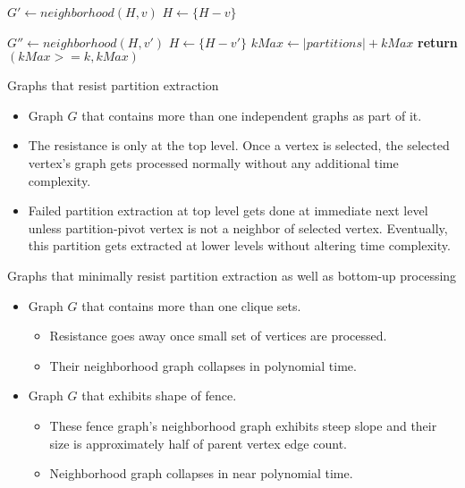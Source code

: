 \documentclass[landscape]{slides}
\begin{document}
\begin{algorithm}
	\begin{algorithmic}[1]
		\State $G' \gets neighborhood(H, v)$
		\State $H \gets \{H - v\}$
		
		\State $G'' \gets neighborhood(H, v')$
		\State $H \gets \{H - v'\}$
		\EndIf
		\EndFor
		\EndWhile
		\State $kMax \gets |partitions| + kMax$
		\State \textbf{return} $(kMax >= k, kMax)$
		\EndFunction
	\end{algorithmic}
\end{algorithm}

\clearpage


\begin{slide}
	\begin{center}{\large Graphs that resist partition extraction}\end{center}
	\begin{itemize}
		\setlength{\itemsep}{0pt}
		\setlength{\parskip}{20pt}
		\setlength{\parsep}{0pt}
		\item Graph $G$ that contains more than one independent graphs as part of it.
		\item The resistance is only at the top level. Once a vertex is selected, the selected vertex's graph gets processed normally without any additional time complexity.
		\item Failed partition extraction at top level gets done at immediate next level unless partition-pivot vertex is not a neighbor of selected vertex. Eventually, this partition gets extracted at lower levels without altering time complexity. 
	\end{itemize}
\end{slide}


\begin{slide}
	\begin{center}{\large Graphs that minimally resist partition extraction as well as bottom-up processing}\end{center}
	\begin{itemize}
		\setlength{\itemsep}{0pt}
		\setlength{\parskip}{20pt}
		\setlength{\parsep}{0pt}
		\item Graph $G$ that contains more than one clique sets.
		\begin{itemize}
			\item Resistance goes away once small set of vertices are processed.
			\item Their neighborhood graph collapses in polynomial time. 
		\end{itemize}
		\item Graph $G$ that exhibits shape of fence.
		\begin{itemize}
			\item These fence graph's neighborhood graph exhibits steep slope and their size is approximately half of parent vertex edge count.
			\item Neighborhood graph collapses in near polynomial time. 
		\end{itemize}
	\end{itemize}
\end{slide}
\end{document}
